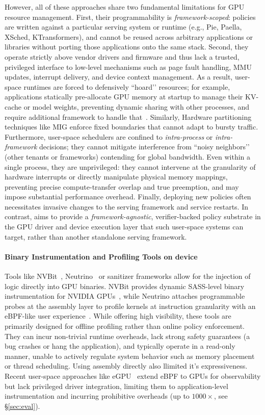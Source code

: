 However, all of these approaches share two fundamental limitations for GPU
resource management. First, their programmability is \emph{framework-scoped}:
policies are written against a particular serving system or runtime (e.g.,
Pie, Paella, XSched, KTransformers), and cannot be reused across arbitrary
applications or libraries without porting those applications onto the same
stack. Second, they operate strictly above vendor drivers and firmware and thus
lack a trusted, privileged interface to low-level mechanisms such as page
fault handling, MMU updates, interrupt delivery, and device context
management. As a result, user-space runtimes are forced to defensively
“hoard’’ resources; for example, applications statically pre-allocate GPU
memory at startup to manage their KV-cache or model weights, 
preventing dynamic sharing with other processes, and require additional framework to handle that~\cite{lmcache}. Similarly,
Hardware partitioning techniques like MIG enforce fixed boundaries that cannot
adapt to bursty traffic. Furthermore, user-space schedulers are confined to
\emph{intra-process} or \emph{intra-framework} decisions; they cannot mitigate
interference from ``noisy neighbors’’ (other tenants or frameworks) contending
for global bandwidth. Even within a single process, they are unprivileged:
they cannot intervene at the granularity of hardware interrupts or directly
manipulate physical memory mappings, preventing precise compute-transfer
overlap and true preemption, and may impose substantial performance overhead.
Finally, deploying new policies often necessitates invasive changes to the
serving framework and service restarts. In contrast, \sys aims to provide a
\emph{framework-agnostic}, verifier-backed policy substrate in the GPU driver
and device execution layer that such user-space systems can target, rather
than another standalone serving framework.



\paragraph{Binary Instrumentation and Profiling Tools on device}
Tools like NVBit~\cite{nvbit}, Neutrino~\cite{neutrino} or sanitizer frameworks allow for the injection of logic directly into GPU binaries. NVBit
provides dynamic SASS-level binary instrumentation for NVIDIA
GPUs~\cite{nvbit}, while Neutrino attaches programmable probes
at the assembly layer to profile kernels at instruction granularity
with an eBPF-like user experience~\cite{neutrino}. While offering high visibility, these tools are primarily designed for offline
profiling rather than online policy enforcement. They can incur
non-trivial runtime overheads, lack strong safety guarantees (a
bug crashes or hang the application), and typically operate in a read-only manner, unable to actively regulate system behavior such as
memory placement or thread scheduling. Using assembly directly also llimited it's expressiveness. Recent user-space approaches like eGPU~\cite{egpu} extend eBPF to GPUs for observability but lack privileged driver integration, limiting them to application-level instrumentation and incurring prohibitive overheads (up to $1000\times$, see \S\ref{sec:eval}).


